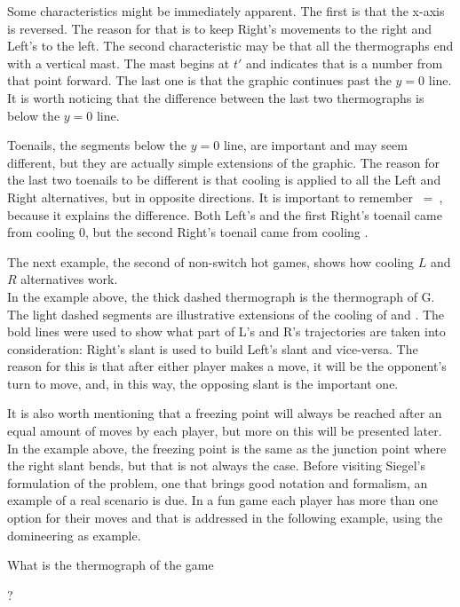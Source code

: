 Some characteristics might be immediately apparent. The first is that the x-axis is reversed. The reason for that is to keep Right's movements to the right and Left's to the left. The second characteristic may be that all the thermographs end with a vertical mast. The mast begins at $t'$ and indicates that \Gm{} is a number from that point forward. The last one is that the graphic continues past the $y=0$ line. It is worth noticing that the difference between the last two thermographs is below the $y=0$ line.

Toenails, the segments below the $y=0$ line, are important and may seem different, but they are actually simple extensions of the graphic. The reason for the last two toenails to be different is that cooling is applied to all the Left and Right alternatives, but in opposite directions. It is important to remember \hbox{ = }, because it explains the difference. Both Left's and the first Right's toenail came from cooling 0, but the second Right's toenail came from cooling .

The next example, the second of non-switch hot games, shows how cooling $L$ and $R$ alternatives work.\\



In the example above, the thick dashed thermograph is the thermograph of G. The light dashed segments are illustrative extensions of the cooling of  and . The bold lines were used to show what part of L's and R's trajectories are taken into consideration: Right's slant is used to build Left's slant and vice-versa. The reason for this is that after either player makes a move, it will be the opponent's turn to move, and, in this way, the opposing slant is the important one.

It is also worth mentioning that a freezing point will always be reached after an equal amount of moves by each player, but more on this will be presented later. In the example above, the freezing point is the same as the junction point where the right slant bends, but that is not always the case. Before visiting Siegel's formulation of the problem, one that brings good notation and formalism, an example of a real scenario is due. In a fun game each player has more than one option for their moves and that is addressed in the following example, using the domineering as example. 

What is the thermograph of the game \Gm{=}
	 ? 

